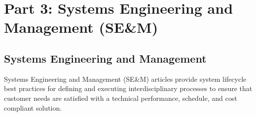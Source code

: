 \documentclass[letterpaper,10pt,english]{jupyterBook}
\begin{document}
\section{Part 3: Systems Engineering and Management (SE\&M)}
\label{\detokenize{SE/sebok:part-3-systems-engineering-and-management-se-m}}

\subsection{Systems Engineering and Management}
\label{\detokenize{SE/sebok:systems-engineering-and-management}}
\sphinxAtStartPar
Systems Engineering and Management (SE\&M) articles provide system lifecycle best practices for defining and executing interdisciplinary processes to ensure that customer needs are satisfied with a technical performance, schedule, and cost compliant solution.
\end{document}
